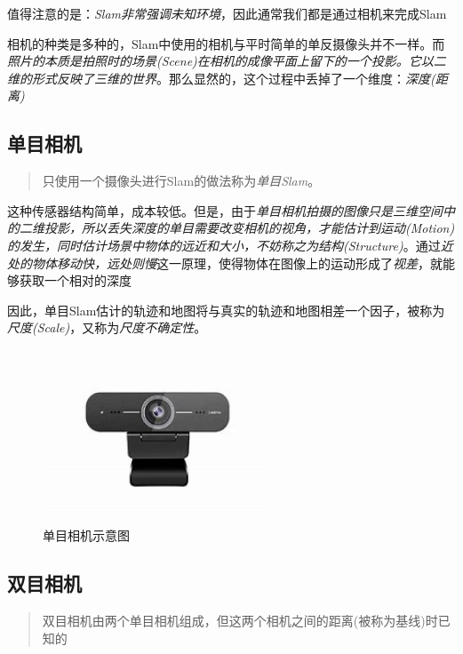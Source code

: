     值得注意的是：\emph{Slam非常强调未知环境}，因此通常我们都是通过相机来完成Slam

    相机的种类是多种的，Slam中使用的相机与平时简单的单反摄像头并不一样。而\emph{照片的本质是拍照时的场景(Scene)在相机的成像平面上留下的一个投影。它以二维的形式反映了三维的世界}。那么显然的，这个过程中丢掉了一个维度：\emph{深度(距离)}

\subsection{单目相机}

\begin{quote}
    \centering
    只使用一个摄像头进行Slam的做法称为\emph{单目Slam}。
\end{quote}

这种传感器结构简单，成本较低。但是，由于\emph{单目相机拍摄的图像只是三维空间中的二维投影，所以丢失深度的单目需要改变相机的视角，才能估计到运动(Motion)的发生，同时估计场景中物体的远近和大小，不妨称之为结构(Structure)}。通过\emph{近处的物体移动快，远处则慢}这一原理，使得物体在图像上的运动形成了\emph{视差}，就能够获取一个相对的深度

因此，单目Slam估计的轨迹和地图将与真实的轨迹和地图相差一个因子，被称为\emph{尺度(Scale)}，又称为\emph{尺度不确定性}。

\begin{figure}[!htbp]
    \centering
    \includegraphics[width=0.6\textwidth]{image/chapter01/单目相机.jpg}
    \caption{单目相机示意图}
\end{figure}

\subsection{双目相机}

\begin{quote}
    \centering
    双目相机由两个单目相机组成，但这两个相机之间的距离(被称为基线)时已知的
\end{quote}

